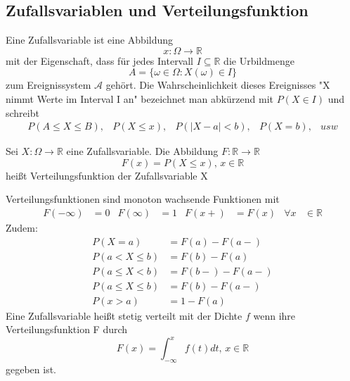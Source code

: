 \documentclass[
	ngerman,
	accentcolor=9c,%
	type=intern,
	marginpar=false
	]{tudapub}
\begin{document}
        \subsection{Zufallsvariablen und Verteilungsfunktion}
            \begin{definition}
                Eine Zufallsvariable ist eine Abbildung
                \begin{equation*}
                    x: \Omega \rightarrow \mathbb{R}
                \end{equation*}
                mit der Eigenschaft, dass für jedes Intervall $I \subseteq \mathbb{R}$ die Urbildmenge
                \begin{equation*}
                    A = \{\omega \in \Omega: X(\omega) \in I\}
                \end{equation*}
                zum Ereignissystem $\mathscr{A}$ gehört. Die Wahrscheinlichkeit dieses Ereignisses "X nimmt Werte im Interval I an"
                bezeichnet man abkürzend mit $P(X\in I)$ und schreibt
                \begin{align*}
                    P(A \leq X \leq B), & P(X \leq x), & P(|X-a|<b), &P(X=b), & usw
                \end{align*}
            \end{definition}
            \setcounter{satz}{2}
            \begin{definition}
                Sei $X:\Omega \rightarrow \mathbb{R}$ eine Zufallsvariable.
                Die Abbildung $F:\mathbb{R}\rightarrow\mathbb{R}$ 
                \begin{equation*}
                    F(x) = P(X \leq x) \mbox{, } x \in \mathbb{R}
                \end{equation*}
                heißt Verteilungsfunktion der Zufallsvariable X
            \end{definition}
            Verteilungsfunktionen sind monoton wachsende Funktionen mit
            \begin{align*}
                F(-\infty) &= 0 & F(\infty) &=1 & F(x+) &= F(x) & \forall x & \in \mathbb{R} 
            \end{align*}
            Zudem:
            \begin{align*}
                P(X = a) &= F(a) - F(a-)\\
                P(a < X \leq b) &= F(b) - F(a)\\
                P(a \leq X < b) &= F(b-) - F(a-)\\
                P(a \leq X \leq b) &= F(b) - F(a-)\\
                P(x > a) &= 1 - F(a)
            \end{align*}
            Eine Zufallsvariable heißt stetig verteilt mit der Dichte $f$ wenn ihre Verteilungsfunktion F durch
            \begin{equation*}
                F(x) = \int_{- \infty}^x f(t) dt\mbox{, } x \in \mathbb{R} 
            \end{equation*}
            gegeben ist.
\end{document}
